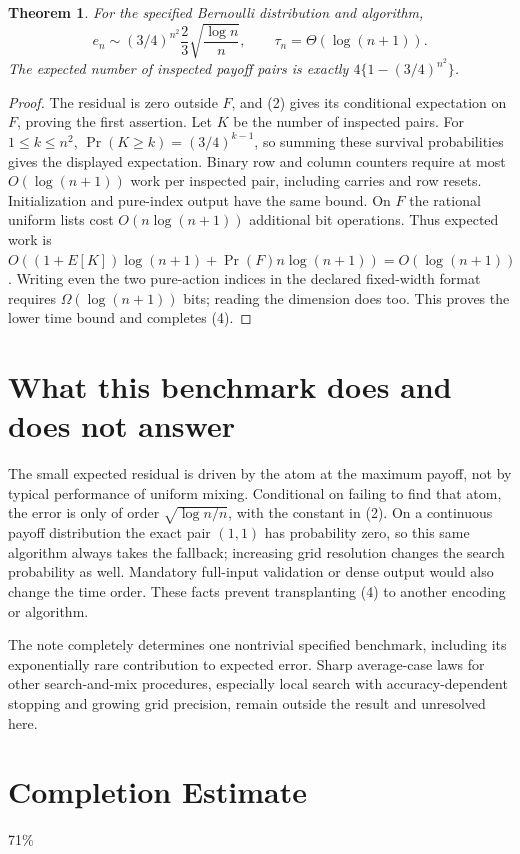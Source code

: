 \documentclass[11pt]{article}
\newtheorem{theorem}{Theorem}
\theoremstyle{definition}
\begin{document}
\begin{theorem}
For the specified Bernoulli distribution and algorithm,
\[
 e_n\sim(3/4)^{n^2}\frac23\sqrt{\frac{\log n}{n}},
 \qquad \tau_n=\Theta(\log(n+1)).                       \tag{4}
\]
The expected number of inspected payoff pairs is exactly
$4\{1-(3/4)^{n^2}\}$.
\end{theorem}
\begin{proof}
The residual is zero outside $F$, and (2) gives its conditional
expectation on $F$, proving the first assertion. Let $K$ be the number
of inspected pairs. For $1\le k\le n^2$,
$\Pr(K\ge k)=(3/4)^{k-1}$, so summing these survival probabilities
gives the displayed expectation. Binary row and column counters require
at most $O(\log(n+1))$ work per inspected pair, including carries and
row resets. Initialization and pure-index output have the same bound.
On $F$ the rational uniform lists cost $O(n\log(n+1))$ additional
bit operations. Thus expected work is
$O((1+E[K])\log(n+1)+\Pr(F)n\log(n+1))=O(\log(n+1))$.
Writing even the two pure-action indices in the declared fixed-width
format requires $\Omega(\log(n+1))$ bits; reading the dimension does
too. This proves the lower time bound and completes (4).
\end{proof}

\section*{What this benchmark does and does not answer}
The small expected residual is driven by the atom at the maximum payoff,
not by typical performance of uniform mixing. Conditional on failing to
find that atom, the error is only of order $\sqrt{\log n/n}$, with the
constant in (2). On a continuous payoff distribution the exact pair
$(1,1)$ has probability zero, so this same algorithm always takes the
fallback; increasing grid resolution changes the search probability as
well. Mandatory full-input validation or dense output would also change
the time order. These facts prevent transplanting (4) to another encoding
or algorithm.

The note completely determines one nontrivial specified benchmark,
including its exponentially rare contribution to expected error. Sharp
average-case laws for other search-and-mix procedures, especially local
search with accuracy-dependent stopping and growing grid precision, remain
outside the result and unresolved here.

\section{Completion Estimate}
71\%
\end{document}
